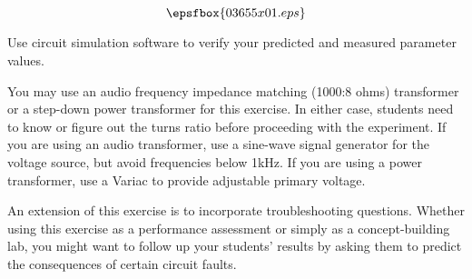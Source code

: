 

$$\epsfbox{03655x01.eps}$$

\vfil \eject






Use circuit simulation software to verify your predicted and measured parameter values.







You may use an audio frequency impedance matching (1000:8 ohms) transformer or a step-down power transformer for this exercise.  In either case, students need to know or figure out the turns ratio before proceeding with the experiment.  If you are using an audio transformer, use a sine-wave signal generator for the voltage source, but avoid frequencies below 1kHz.  If you are using a power transformer, use a Variac to provide adjustable primary voltage.

An extension of this exercise is to incorporate troubleshooting questions.  Whether using this exercise as a performance assessment or simply as a concept-building lab, you might want to follow up your students' results by asking them to predict the consequences of certain circuit faults.




